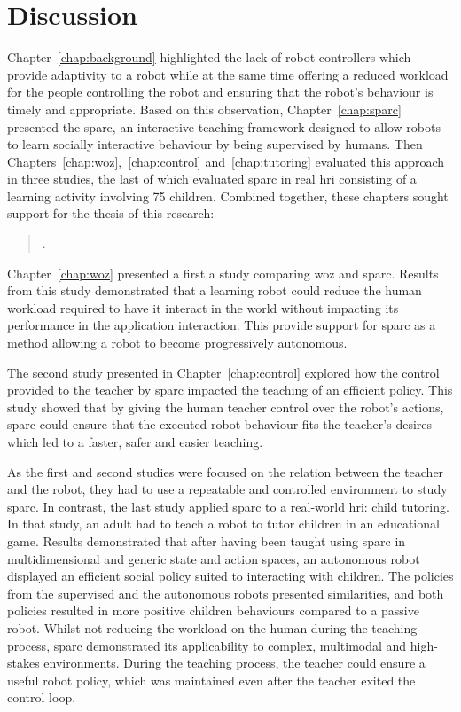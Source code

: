 \chapter{Discussion} \label{chap:discussion}
\glsresetall

Chapter~\ref{chap:background} highlighted the lack of robot controllers which provide adaptivity to a robot while at the same time offering a reduced workload for the people controlling the robot and ensuring that the robot's behaviour is timely and appropriate. Based on this observation, Chapter~\ref{chap:sparc} presented the \gls{sparc}, an interactive teaching framework designed to allow robots to learn socially interactive behaviour by being supervised by humans. Then Chapters~\ref{chap:woz},~\ref{chap:control} and~\ref{chap:tutoring} evaluated this approach in three studies, the last of which evaluated \gls{sparc} in real \gls{hri} consisting of a learning activity involving 75 children. Combined together, these chapters sought support for the thesis of this research:

\begin{quote}
	\thesis.
\end{quote}

Chapter~\ref{chap:woz} presented a first a study comparing \gls{woz} and \gls{sparc}. Results from this study demonstrated that a learning robot could reduce the human workload required to have it interact in the world without impacting its performance in the application interaction. This provide support for \gls{sparc} as a method allowing a robot to become progressively autonomous. 

The second study presented in Chapter~\ref{chap:control} explored how the control provided to the teacher by \gls{sparc} impacted the teaching of an efficient policy. This study showed that by giving the human teacher control over the robot's actions, \gls{sparc} could ensure that the executed robot behaviour fits the teacher's desires which led to a faster, safer and easier teaching. 

As the first and second studies were focused on the relation between the teacher and the robot, they had to use a repeatable and controlled environment to study \gls{sparc}. In contrast, the last study applied \gls{sparc} to a real-world \gls{hri}: child tutoring. In that study, an adult had to teach a robot to tutor children in an educational game. Results demonstrated that after having been taught using \gls{sparc} in multidimensional and generic state and action spaces, an autonomous robot displayed an efficient social policy suited to interacting with children. The policies from the supervised and the autonomous robots presented similarities, and both policies resulted in more positive children behaviours compared to a passive robot. Whilst not reducing the workload on the human during the teaching process, \gls{sparc} demonstrated its applicability to complex, multimodal and high-stakes environments. During the teaching process, the teacher could ensure a useful robot policy, which was maintained even after the teacher exited the control loop.

